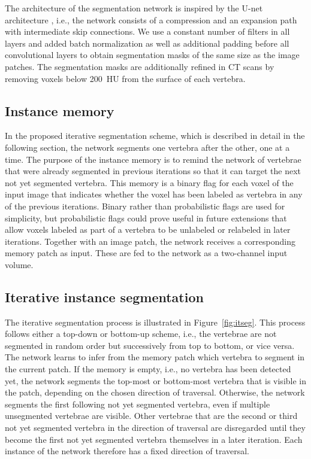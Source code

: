 \documentclass[authoryear,5p,final,times]{elsarticle}
\begin{document}
    The architecture of the segmentation network is inspired by the U-net architecture \citep{Ronneberger2015,Cicek2016}, i.e., the network consists of a compression and an expansion path with intermediate skip connections. We use a constant number of filters in all layers and added batch normalization as well as additional padding before all convolutional layers to obtain segmentation masks of the same size as the image patches. The segmentation masks are additionally refined in CT scans by removing voxels below \SI{200}{HU} from the surface of each vertebra.
    
    \subsection{Instance memory}
    \label{sec:method_memory}
    
    In the proposed iterative segmentation scheme, which is described in detail in the following section, the network segments one vertebra after the other, one at a time. The purpose of the instance memory is to remind the network of vertebrae that were already segmented in previous iterations so that it can target the next not yet segmented vertebra. This memory is a binary flag for each voxel of the input image that indicates whether the voxel has been labeled as vertebra in any of the previous iterations. Binary rather than probabilistic flags are used for simplicity, but probabilistic flags could prove useful in future extensions that allow voxels labeled as part of a vertebra to be unlabeled or relabeled in later iterations. Together with an image patch, the network receives a corresponding memory patch as input. These are fed to the network as a two-channel input volume.
    
    \subsection{Iterative instance segmentation}
    \label{sec:method_iterative}
    
    The iterative segmentation process is illustrated in Figure~\ref*{fig:itseg}. This process follows either a top-down or bottom-up scheme, i.e., the vertebrae are not segmented in random order but successively from top to bottom, or vice versa. The network learns to infer from the memory patch which vertebra to segment in the current patch. If the memory is empty, i.e., no vertebra has been detected yet, the network segments the top-most or bottom-most vertebra that is visible in the patch, depending on the chosen direction of traversal. Otherwise, the network segments the first following not yet segmented vertebra, even if multiple unsegmented vertebrae are visible. Other vertebrae that are the second or third not yet segmented vertebra in the direction of traversal are disregarded until they become the first not yet segmented vertebra themselves in a later iteration. Each instance of the network therefore has a fixed direction of traversal.
    
\end{document}
